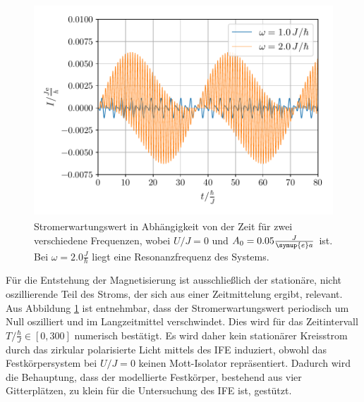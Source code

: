 \begin{figure}
  \centering
  \includegraphics[height=8.0cm]{Plots/U0_E01_schoen.pdf}
  \caption{Stromerwartungswert in Abhängigkeit von der Zeit für zwei verschiedene Frequenzen, wobei $U/J = 0$ und $A_0 = 0.05 \tfrac{J}{\symup{e}a}$ ist.
  Bei $\omega = 2.0\tfrac{J}{\hbar}$ liegt eine Resonanzfrequenz des Systems.}
  \label{fig:U0plot}
\end{figure}

Für die Entstehung der Magnetisierung ist ausschließlich der stationäre, nicht oszillierende Teil des Stroms, der sich aus einer Zeitmittelung ergibt, relevant.
Aus Abbildung \ref{fig:U0plot} ist entnehmbar, dass der Stromerwartungswert periodisch um Null oszilliert und im Langzeitmittel verschwindet. Dies wird für
das Zeitintervall $T/\tfrac{\hbar}{J} \in [0,300]$ numerisch bestätigt.
Es wird daher kein stationärer Kreisstrom durch das zirkular polarisierte Licht mittels des IFE induziert, obwohl das Festkörpersystem bei $U/J = 0$ keinen Mott-Isolator
repräsentiert. Dadurch wird die Behauptung, dass der modellierte Festkörper, bestehend aus vier Gitterplätzen, zu klein für die Untersuchung des IFE ist, gestützt.

